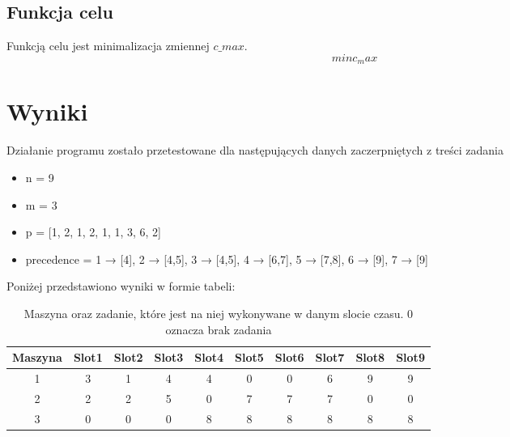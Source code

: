 \documentclass[a4paper,14pt]{report}
\begin{document}
    \subsection{Funkcja celu}
    Funkcją celu jest minimalizacja zmiennej $c\_max$.
    \begin{equation}
        min c_max
    \end{equation}
\section{Wyniki}
    Działanie programu zostało przetestowane dla następujących danych zaczerpniętych
    z treści zadania
    \begin{itemize}
        \item n = 9
        \item m = 3
        \item p = [1, 2, 1, 2, 1, 1, 3, 6, 2] 
        \item precedence = 1 → [4], 2 → [4,5], 3 → [4,5], 4 → [6,7], 5 → [7,8], 6 → [9], 7 → [9]
    \end{itemize}
    Poniżej przedstawiono wyniki w formie tabeli:
    \begin{table}[H]
        \centering
        \begin{tabular}{|c | c | c | c | c | c | c | c | c | c |} 
        \hline
        Maszyna & Slot1 & Slot2 & Slot3 & Slot4 & Slot5 & Slot6 & Slot7 & Slot8 & Slot9\\
        \hline
        1 & 3 & 1 & 4 & 4 & 0 & 0 & 6 & 9 & 9 \\
        2 & 2 & 2 & 5 & 0 & 7 & 7 & 7 & 0 & 0  \\
        3 & 0 & 0 & 0 & 8 & 8 & 8 & 8 & 8 & 8  \\
        \hline
        \end{tabular}
        \caption{Maszyna oraz zadanie, które jest na niej wykonywane w danym slocie czasu. 0 oznacza brak zadania}
    \end{table}
\end{document}
